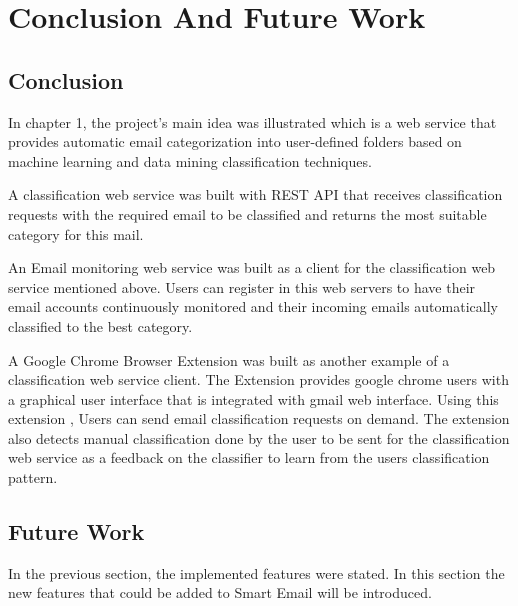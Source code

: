 
\chapter{Conclusion And Future Work} %

\label{Chapter7} %




\section{Conclusion}
In chapter 1, the project's main idea was illustrated which
is a web service that provides automatic email categorization into
user-defined folders based on machine learning and data mining
classification techniques.

A classification web service was built with REST API \cite{REST} that receives
classification requests with the required email to be classified and returns
the most suitable category for this mail.

An Email monitoring web service was built as a client for the classification
web service mentioned above. Users can register in this web servers to have
their email accounts continuously monitored and their incoming emails automatically
classified to the best category.

A Google Chrome Browser \cite{CHROME} Extension was built as another example of a
classification web service client. The Extension provides google chrome users
with a graphical user interface that is integrated with gmail web interface.
Using this extension , Users can send email classification requests on demand.
The extension also detects manual classification done by the user to be sent
for the classification web service as a feedback on the classifier to learn
from the users classification pattern.
\section{Future Work}
In the previous section, the implemented features were stated. In this section
the new features that could be added to Smart Email will be introduced.

